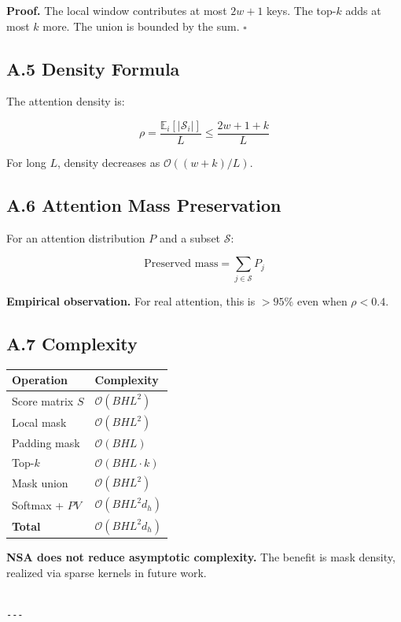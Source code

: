 \textbf{Proof.} The local window contributes at most $2w + 1$ keys. The top-$k$ 
adds at most $k$ more. The union is bounded by the sum. $\square$

\subsection{A.5 Density Formula}

The attention density is:

\[
\rho = \frac{\mathbb{E}_i[|\mathcal{S}_i|]}{L} \leq \frac{2w + 1 + k}{L}
\tag{A.2}
\]

For long $L$, density decreases as $\mathcal{O}((w + k) / L)$.

\subsection{A.6 Attention Mass Preservation}

For an attention distribution $P$ and a subset $\mathcal{S}$:

\[
\text{Preserved mass} = \sum_{j \in \mathcal{S}} P_j
\tag{A.3}
\]

\textbf{Empirical observation.} For real attention, this is $> 95\%$ even when 
$\rho < 0.4$.

\subsection{A.7 Complexity}

\begin{table}[H]
\centering
\small
\begin{tabular}{ll}
\toprule
\textbf{Operation} & \textbf{Complexity} \\
\midrule
Score matrix $S$ & $\mathcal{O}(B H L^2)$ \\
Local mask & $\mathcal{O}(B H L^2)$ \\
Padding mask & $\mathcal{O}(B H L)$ \\
Top-$k$ & $\mathcal{O}(B H L \cdot k)$ \\
Mask union & $\mathcal{O}(B H L^2)$ \\
Softmax + $P V$ & $\mathcal{O}(B H L^2 d_h)$ \\
\textbf{Total} & $\mathcal{O}(B H L^2 d_h)$ \\
\bottomrule
\end{tabular}
\end{table}

\textbf{NSA does not reduce asymptotic complexity.} The benefit is mask density, 
realized via sparse kernels in future work.
\begin{lstlisting}

---
\end{lstlisting}


